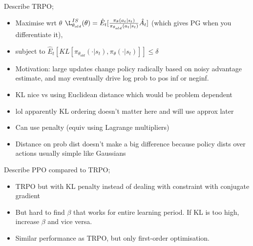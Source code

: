 \documentclass{article}
\begin{document}

Describe TRPO; \begin{itemize}
    \item Maximise wrt $\theta$ $\L^{IS}_{\theta_{old}}(\theta) = \hat{E}_t[\frac{\pi_\theta(a_t|s_t)}{\pi_{\theta_{old}}(a_t|s_t)}\hat{A_t}]$ (which gives PG when you differentiate it), 
    \item subject to $\hat{E}_t[KL[\pi_{\theta_{old}}(\cdot|s_t), \pi_{\theta}(\cdot|s_t)]]\leq \delta$
    \item Motivation: large updates change policy radically based on noisy advantage estimate, and may eventually drive log prob to pos inf or neginf.
    \item KL nice vs using Euclidean distance which would be problem dependent 
    \item lol apparently KL ordering doesn't matter here and will use approx later
    \item Can use penalty (equiv using Lagrange multipliers)
    \item Distance on prob dist doesn't make a big difference because policy dists over actions usually simple like Gaussians
\end{itemize}

Describe PPO compared to TRPO; \begin{itemize}
    \item TRPO but with KL penalty instead of dealing with constraint with conjugate gradient
    \item But hard to find $\beta$ that works for entire learning period. If KL is too high, increase $\beta$ and vice versa.
    \item Similar performance as TRPO, but only first-order optimisation.
\end{itemize}

\end{document}
